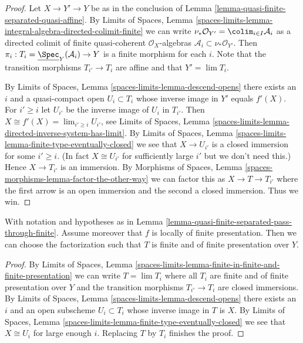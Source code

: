 \begin{proof}
Let $X \to Y' \to Y$ be as in the conclusion of
Lemma \ref{lemma-quasi-finite-separated-quasi-affine}.
By
Limits of Spaces, Lemma
\ref{spaces-limits-lemma-integral-algebra-directed-colimit-finite}
we can write
$\nu_*\mathcal{O}_{Y'} = \colim_{i \in I} \mathcal{A}_i$ as a
directed colimit of finite quasi-coherent $\mathcal{O}_X$-algebras
$\mathcal{A}_i \subset \nu_*\mathcal{O}_{Y'}$. Then
$\pi_i : T_i = \underline{\Spec}_Y(\mathcal{A}_i) \to Y$
is a finite morphism for each $i$.
Note that the transition morphisms $T_{i'} \to T_i$ are affine
and that $Y' = \lim T_i$.

\medskip\noindent
By Limits of Spaces, Lemma \ref{spaces-limits-lemma-descend-opens}
there exists an $i$ and a quasi-compact open
$U_i \subset T_i$ whose inverse image in $Y'$ equals
$f'(X)$. For $i' \geq i$ let $U_{i'}$ be the inverse image
of $U_i$ in $T_{i'}$. Then $X \cong f'(X) = \lim_{i' \geq i} U_{i'}$, see
Limits of Spaces, Lemma
\ref{spaces-limits-lemma-directed-inverse-system-has-limit}.
By
Limits of Spaces, Lemma
\ref{spaces-limits-lemma-finite-type-eventually-closed} we see that
$X \to U_{i'}$ is a closed immersion for some $i' \geq i$.
(In fact $X \cong U_{i'}$ for sufficiently
large $i'$ but we don't need this.) Hence $X \to T_{i'}$ is an immersion. By
Morphisms of Spaces, Lemma
\ref{spaces-morphisms-lemma-factor-the-other-way}
we can factor this as $X \to T \to T_{i'}$ where the first arrow
is an open immersion and the second a closed immersion. Thus we win.
\end{proof}

\begin{lemma}
\label{lemma-quasi-finite-separated-pass-through-finite-addendum}
With notation and hypotheses as in
Lemma \ref{lemma-quasi-finite-separated-pass-through-finite}.
Assume moreover that $f$ is locally of finite presentation. Then we can
choose the factorization such that $T$ is finite and of
finite presentation over $Y$.
\end{lemma}

\begin{proof}
By Limits of Spaces, Lemma
\ref{spaces-limits-lemma-finite-in-finite-and-finite-presentation} we can write
$T = \lim T_i$ where all $T_i$ are finite and of finite presentation
over $Y$ and the transition morphisms $T_{i'} \to T_i$ are closed
immersions. By
Limits of Spaces, Lemma \ref{spaces-limits-lemma-descend-opens}
there exists an $i$ and an open subscheme $U_i \subset T_i$ whose inverse
image in $T$ is $X$. By
Limits of Spaces, Lemma
\ref{spaces-limits-lemma-finite-type-eventually-closed}
we see that $X \cong U_i$ for large enough $i$.
Replacing $T$ by $T_i$ finishes the proof.
\end{proof}












